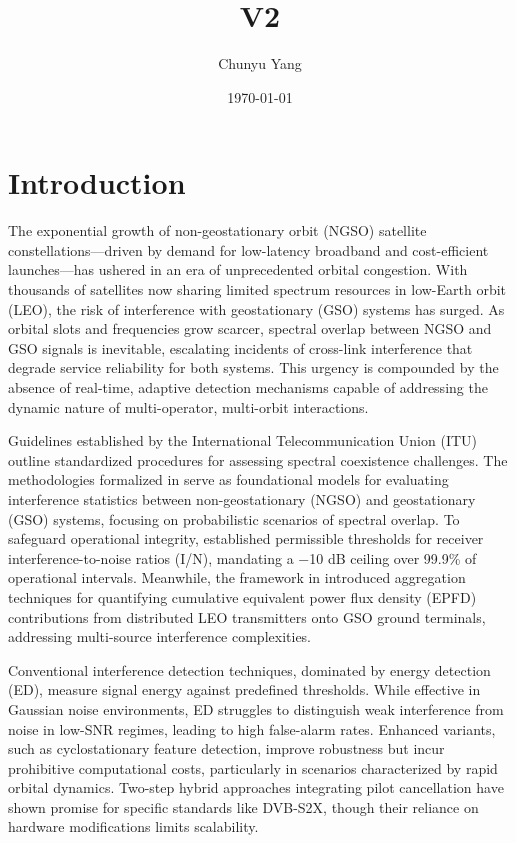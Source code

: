 \documentclass[12pt]{article}
\title{V2}
\author{Chunyu Yang}
\date{\today}
\begin{document}
\maketitle

\section{Introduction}

The exponential growth of non-geostationary orbit (NGSO) satellite constellations—driven by demand for low-latency broadband and cost-efficient launches—has ushered in an era of unprecedented orbital congestion. With thousands of satellites now sharing limited spectrum resources in low-Earth orbit (LEO), the risk of interference with geostationary (GSO) systems has surged. As orbital slots and frequencies grow scarcer, spectral overlap between NGSO and GSO signals is inevitable, escalating incidents of cross-link interference that degrade service reliability for both systems\cite{itu2020}. This urgency is compounded by the absence of real-time, adaptive detection mechanisms capable of addressing the dynamic nature of multi-operator, multi-orbit interactions.

Guidelines established by the International Telecommunication Union (ITU) outline standardized procedures for assessing spectral coexistence challenges. The methodologies formalized in \cite{itur2001SimulationMethodologiesDetermining} serve as foundational models for evaluating interference statistics between non-geostationary (NGSO) and geostationary (GSO) systems, focusing on probabilistic scenarios of spectral overlap. To safeguard operational integrity, \cite{itur2017ProtectionCriteriaOperation} established permissible thresholds for receiver interference-to-noise ratios (I/N), mandating a −10 dB ceiling over 99.9\% of operational intervals. Meanwhile, the framework in \cite{itur2002AggregateDownlinkEquivalent} introduced aggregation techniques for quantifying cumulative equivalent power flux density (EPFD) contributions from distributed LEO transmitters onto GSO ground terminals, addressing multi-source interference complexities.


Conventional interference detection techniques, dominated by energy detection (ED), measure signal energy against predefined thresholds\cite{kay2009fundamentals}. While effective in Gaussian noise environments, ED struggles to distinguish weak interference from noise in low-SNR regimes, leading to high false-alarm rates. Enhanced variants, such as cyclostationary feature detection\cite{experimentalCyclostationary}, improve robustness but incur prohibitive computational costs, particularly in scenarios characterized by rapid orbital dynamics. Two-step hybrid approaches \cite{wangCoFrequencyInterferenceAnalysis2020} integrating pilot cancellation have shown promise for specific standards like DVB-S2X, though their reliance on hardware modifications limits scalability.
\end{document}
